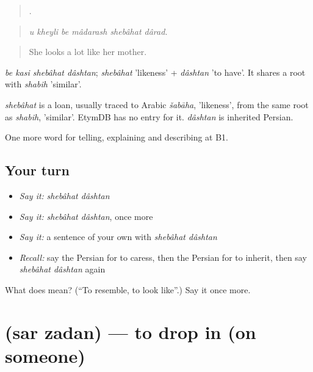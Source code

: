 \begin{quote}
     .
\end{quote}

\begin{quote}
\emph{u kheyli be mâdarash shebâhat dârad.}
\end{quote}

\begin{quote}
She looks a lot like her mother.
\end{quote}

\emph{be kasi shebâhat dâshtan}; \emph{shebâhat} 'likeness' + \emph{dâshtan} 'to have'. It shares a root with \emph{shabih} 'similar'.

\begin{cousinweb}
\emph{shebâhat} is a loan, usually traced to Arabic \emph{šabāha}, 'likeness', from the same root as \emph{shabih}, 'similar'. EtymDB has no entry for it. \emph{dâshtan} is inherited Persian.
\end{cousinweb}

\begin{grammarlens}[title={What you've built}]
One more word for telling, explaining and describing at B1.
\end{grammarlens}

\subsection*{Your turn}
\begin{itemize}
\raggedright
  \item \emph{Say it:} \emph{shebâhat dâshtan}
  \item \emph{Say it:} \emph{shebâhat dâshtan}, once more
  \item \emph{Say it:} a sentence of your own with \emph{shebâhat dâshtan}
  \item \emph{Recall:} say the Persian for to caress, then the Persian for to inherit, then say \emph{shebâhat dâshtan} again
\end{itemize}

\begin{tcolorbox}[breakable,colback=teal!4,colframe=teal!35!black,title={Before you move on}]
What does   mean? (\textquotedblleft{}To resemble, to look like\textquotedblright{}.) Say it once more.
\end{tcolorbox}
\section[\texorpdfstring{\fa{سر} \fa{زدن} (sar zadan)}{سر زدن (sar zadan)}]{  (sar zadan) — to drop in (on someone)}

